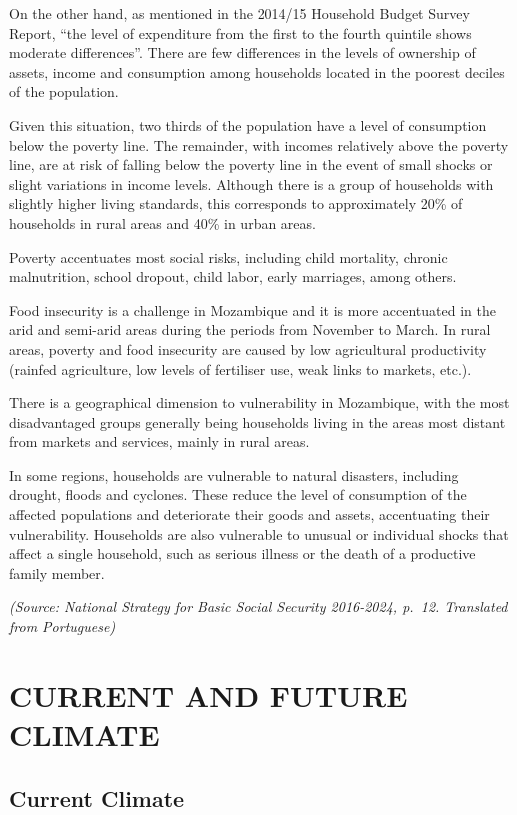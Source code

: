\documentclass[
]{book}
\begin{document}
On the other hand, as mentioned in the 2014/15 Household Budget Survey Report, ``the level of expenditure from the first to the fourth quintile shows moderate differences''. There are few differences in the levels of ownership of assets, income and consumption among households located in the poorest deciles of the population.

Given this situation, two thirds of the population have a level of consumption below the poverty line. The remainder, with incomes relatively above the poverty line, are at risk of falling below the poverty line in the event of small shocks or slight variations in income levels. Although there is a group of households with slightly higher living standards, this corresponds to approximately 20\% of households in rural areas and 40\% in urban areas.

Poverty accentuates most social risks, including child mortality, chronic malnutrition, school dropout, child labor, early marriages, among others.

Food insecurity is a challenge in Mozambique and it is more accentuated in the arid and semi-arid areas during the periods from November to March. In rural areas, poverty and food insecurity are caused by low agricultural productivity (rainfed agriculture, low levels of fertiliser use, weak links to markets, etc.).

There is a geographical dimension to vulnerability in Mozambique, with the most disadvantaged groups generally being households living in the areas most distant from markets and services, mainly in rural areas.

In some regions, households are vulnerable to natural disasters, including drought, floods and cyclones. These reduce the level of consumption of the affected populations and deteriorate their goods and assets, accentuating their vulnerability. Households are also vulnerable to unusual or individual shocks that affect a single household, such as serious illness or the death of a productive family member.

\emph{(Source: National Strategy for Basic Social Security 2016-2024, p.~12. Translated from Portuguese)}

\hypertarget{current-and-future-climate}{%
\chapter{CURRENT AND FUTURE CLIMATE}\label{current-and-future-climate}}

\hypertarget{current-climate}{%
\section{Current Climate}\label{current-climate}}
\end{document}
